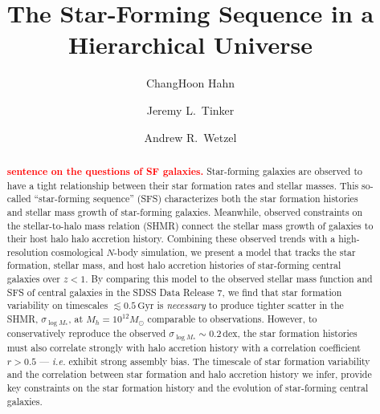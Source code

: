 \documentclass[12pt, letterpaper, preprint, tighten]{aastex62}
\newcommand{\todo}[1]{{\bf \textcolor{red}{#1}}}
\begin{document}
\sloppy\sloppypar\frenchspacing

\title{The Star-Forming Sequence in a Hierarchical Universe} 
\author{ChangHoon Hahn}
\author{Jeremy L.~Tinker} 
\author{Andrew R.~Wetzel}

\begin{abstract}
    \todo{sentence on the questions of SF galaxies.}
    Star-forming galaxies are observed to have a tight relationship between their 
    star  formation rates and stellar masses. This so-called ``star-forming 
    sequence'' (SFS) characterizes both the star formation histories and stellar 
    mass growth of star-forming galaxies. Meanwhile, observed constraints on the 
    stellar-to-halo mass relation (SHMR) connect the stellar mass growth of galaxies 
    to their host halo halo accretion history. Combining these observed trends with 
    a high-resolution cosmological $N$-body simulation, we present a model that 
    tracks the star formation, stellar mass, and host halo accretion histories of 
    star-forming central galaxies over $z < 1$. By comparing this model to the 
    observed stellar mass function and SFS of central galaxies in the SDSS Data 
    Release 7, we find that star formation variability on timescales $\lesssim 0.5\,\mathrm{Gyr}$ 
    is \emph{necessary} to produce tighter scatter in the SHMR, $\sigma_{\log M_*}$, 
    at $M_h{=}10^{12}M_\odot$ comparable to observations. However, to conservatively 
    reproduce the observed $\sigma_{\log M_*}{\sim}0.2\,\mathrm{dex}$, the star 
    formation histories must also correlate strongly with halo accretion history 
    with a correlation coefficient $r > 0.5$ --- \emph{i.e.} exhibit strong assembly 
    bias. The timescale of star formation variability and the correlation between star
    formation and halo accretion history we infer, provide key constraints on 
    the star formation history and the evolution of star-forming central galaxies.
\end{abstract}
    
\end{document}
